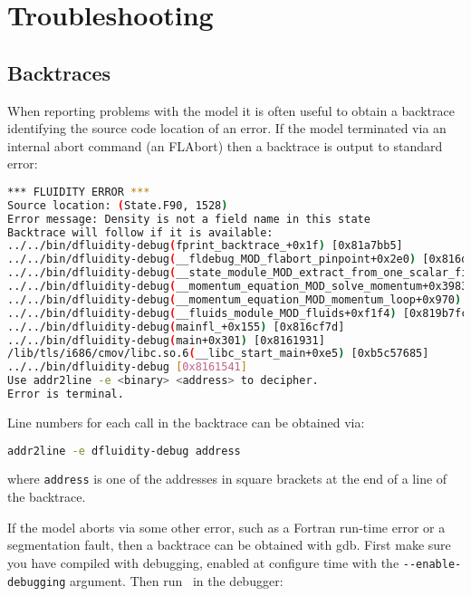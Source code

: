 \chapter{Troubleshooting}

\section{Backtraces}

When reporting problems with the model it is often useful to obtain a backtrace
identifying the source code location of an error. If the model terminated via
an internal abort command (an FLAbort) then a backtrace is output to standard
error:

\begin{lstlisting}[language = Bash]
*** FLUIDITY ERROR ***
Source location: (State.F90, 1528)
Error message: Density is not a field name in this state
Backtrace will follow if it is available:
../../bin/dfluidity-debug(fprint_backtrace_+0x1f) [0x81a7bb5]
../../bin/dfluidity-debug(__fldebug_MOD_flabort_pinpoint+0x2e0) [0x816d575]
../../bin/dfluidity-debug(__state_module_MOD_extract_from_one_scalar_field+0xb23) [0x822448f]
../../bin/dfluidity-debug(__momentum_equation_MOD_solve_momentum+0x3983) [0x8779c1c]
../../bin/dfluidity-debug(__momentum_equation_MOD_momentum_loop+0x970) [0x8785bdc]
../../bin/dfluidity-debug(__fluids_module_MOD_fluids+0xf1f4) [0x819b7fc]
../../bin/dfluidity-debug(mainfl_+0x155) [0x816cf7d]
../../bin/dfluidity-debug(main+0x301) [0x8161931]
/lib/tls/i686/cmov/libc.so.6(__libc_start_main+0xe5) [0xb5c57685]
../../bin/dfluidity-debug [0x8161541]
Use addr2line -e <binary> <address> to decipher.
Error is terminal.
\end{lstlisting}

Line numbers for each call in the backtrace can be obtained via:

\begin{lstlisting}[language = Bash]
addr2line -e dfluidity-debug address
\end{lstlisting}

where \lstinline[language = Bash]*address* is one of the addresses in square
brackets at the end of a line of the backtrace.

If the model aborts via some other error, such as a Fortran run-time error or
a segmentation fault, then a backtrace can be obtained with gdb. First make
sure you have compiled with debugging, enabled at configure time with the
\lstinline[language = Bash]*--enable-debugging* argument. Then run
\fluidity\ in the debugger:

